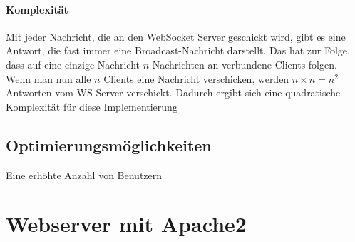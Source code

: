 \paragraph{Komplexität}
Mit jeder Nachricht, die an den WebSocket Server geschickt wird, gibt es eine Antwort, die fast immer eine Broadcast-Nachricht darstellt. Das hat zur Folge, dass auf eine einzige Nachricht $n$ Nachrichten an verbundene Clients folgen. Wenn man nun alle $n$ Clients eine Nachricht verschicken, werden $n \times n = n^2$ Antworten vom WS Server verschickt. Dadurch ergibt sich eine quadratische Komplexität für diese Implementierung

\subsection{Optimierungsmöglichkeiten}
Eine erhöhte Anzahl von Benutzern 

\section{Webserver mit Apache2}